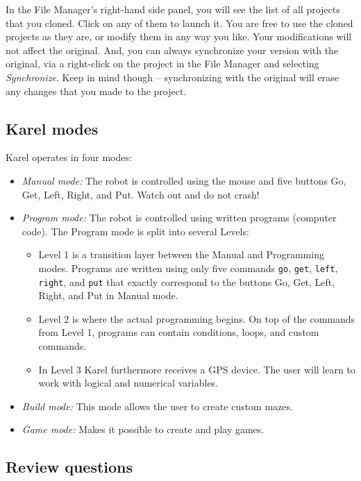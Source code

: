 In the File Manager's right-hand side panel, you will see the list of all 
projects that you cloned. Click on any of them to launch it. You are free to 
use the cloned projects as they are, or modify them in any way you like. Your 
modifications will not affect the original. And, you can 
always synchronize your version with the original, via 
a right-click on the project in the File Manager and selecting {\em Synchronize}.
Keep in mind though -- synchronizing with the original will erase any changes that 
you made to the project.

\subsection{Karel modes} \label{levels}

Karel operates in four modes:
\begin{itemize}
\item {\em Manual mode:} The robot is controlled using the mouse and five buttons Go, Get, Left, Right, and Put. 
      Watch out and do not crash!
\item {\em Program mode:} The robot is controlled using written programs (computer code). The Program mode is 
      split into several Levels:
\begin{itemize}
\item Level 1 is a transition layer between the Manual and Programming modes. Programs are written using only 
      five commands {\tt go}, {\tt get}, {\tt left}, {\tt right}, and {\tt put} that exactly correspond to 
      the buttons Go, Get, Left, Right, and Put in Manual mode.
\item Level 2 is where the actual programming begins. On top of the commands from Level 1, programs can contain 
      conditions, loops, and custom commands.
\item In Level 3 Karel furthermore receives a GPS device. The user will learn to work with logical 
      and numerical variables. 
\end{itemize}
\item {\em Build mode:} This mode allows the user to create custom mazes.
\item {\em Game mode:} Makes it possible to create and play games. 
\end{itemize}

\subsection{Review questions}


